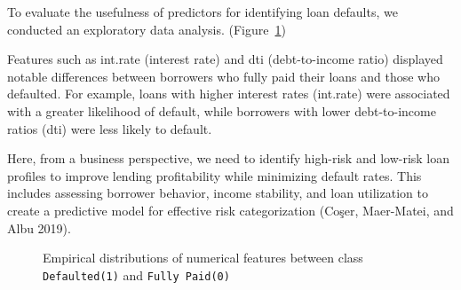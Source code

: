 \documentclass[
  letterpaper,
  DIV=11,
  numbers=noendperiod]{scrartcl}
\begin{document}
To evaluate the usefulness of predictors for identifying loan defaults,
we conducted an exploratory data analysis.
(Figure~\ref{fig-feature_dist})

Features such as int.rate (interest rate) and dti (debt-to-income ratio)
displayed notable differences between borrowers who fully paid their
loans and those who defaulted. For example, loans with higher interest
rates (int.rate) were associated with a greater likelihood of default,
while borrowers with lower debt-to-income ratios (dti) were less likely
to default.

Here, from a business perspective, we need to identify high-risk and
low-risk loan profiles to improve lending profitability while minimizing
default rates. This includes assessing borrower behavior, income
stability, and loan utilization to create a predictive model for
effective risk categorization (Coşer, Maer-Matei, and Albu 2019).

\begin{figure}


\caption{\label{fig-feature_dist}Empirical distributions of numerical
features between class \texttt{Defaulted(1)} and
\texttt{Fully\ Paid(0)}}

\end{figure}%
\end{document}
